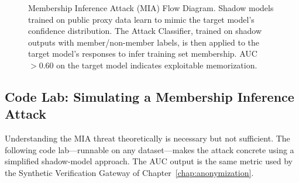 \begin{figure}[h]
\caption{Membership Inference Attack (MIA) Flow Diagram. Shadow models trained
         on public proxy data learn to mimic the target model's confidence distribution.
         The Attack Classifier, trained on shadow outputs with member/non-member labels,
         is then applied to the target model's responses to infer training set membership.
         AUC $>0.60$ on the target model indicates exploitable memorization.}
\label{fig:ch6_mia}
\end{figure}

\subsection{Code Lab: Simulating a Membership Inference Attack}
\label{subsec:mia_code_lab}

Understanding the MIA threat theoretically is necessary but not sufficient. The following code lab---runnable on any dataset---makes the attack concrete using a simplified shadow-model approach. The AUC output is the same metric used by the Synthetic Verification Gateway of Chapter~\ref{chap:anonymization}.

